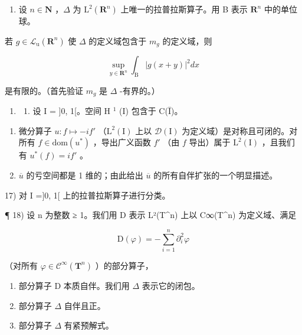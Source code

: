 \begin{enumerate}
\def\labelenumi{\arabic{enumi})}
\setcounter{enumi}{14}
\tightlist
\item
  设 \(n \in \mathbf{N}\) ，\(\Delta\) 为 \(\mathrm{L}^2(\mathbf{R}^n)\) 上唯一的拉普拉斯算子。用 B 表示 \(\mathbf{R}^n\) 中的单位球。
\end{enumerate}

若 \(g \in \mathcal{L}_{\mathrm{u}}(\mathbf{R}^{n})\) 使 \(\Delta\) 的定义域包含于 \(m_{g}\) 的定义域，则

\[
\sup _ {y \in \mathbf {R} ^ {n}} \int_ {\mathrm{B}} | g (x + y) | ^ {2} d x
\]

是有限的。（首先验证 \(m_{g}\) 是 \(\Delta\) -有界的。）

\begin{enumerate}
\def\labelenumi{\arabic{enumi})}
\setcounter{enumi}{15}
\tightlist
\item
  \begin{enumerate}
  \def\labelenumii{\alph{enumii})}
  \tightlist
  \item
    设 I = {]}0, 1{[}。空间 H \(^{1}\) (I) 包含于 C(Ī)。
  \end{enumerate}
\end{enumerate}

\begin{enumerate}
\def\labelenumi{\alph{enumi})}
\setcounter{enumi}{1}
\item
  微分算子 \(u\colon f\mapsto -if'\) （\(\mathrm{L}^2 (\mathrm{I})\) 上以 \(\mathcal{D}(\mathrm{I})\) 为定义域）是对称且可闭的。对所有 \(f\in \mathrm{dom}(u^{*})\) ，导出广义函数 \(f'\) （由 \(f\) 导出）属于 \(\mathrm{L}^2 (\mathrm{I})\) ，且我们有 \(u^{*}(f) = if'\) 。
\item
  \(\overline{u}\) 的亏空间都是 1 维的；由此给出 \(\overline{u}\) 的所有自伴扩张的一个明显描述。
\end{enumerate}

17) 对 I ={]}0, 1{[} 上的拉普拉斯算子进行分类。

¶ 18) 设 n 为整数 ≥ 1。我们用 D 表示 L²(T\^{}n) 上以 C∞(T\^{}n) 为定义域、满足

\[
\mathrm{D} (\varphi) = - \sum_ {i = 1} ^ {n} \partial_ {i} ^ {2} \varphi
\]

（对所有 \(\varphi\in\mathcal{C}^{\infty}(\mathbf{T}^{n})\) ）的部分算子，

\begin{enumerate}
\def\labelenumi{\alph{enumi})}
\item
  部分算子 D 本质自伴。我们用 \(\Delta\) 表示它的闭包。
\item
  部分算子 \(\Delta\) 自伴且正。
\item
  部分算子 \(\Delta\) 有紧预解式。
\end{enumerate}

